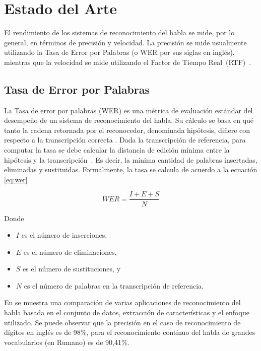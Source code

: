 \section{Estado del Arte}
\label{sec:estado}

El rendimiento de los sistemas de reconocimiento del habla se mide, por lo general, en t\'erminos
de precisi\'on y velocidad. La precisi\'on se mide usualmente utilizando la Tasa de Error por Palabras
(o WER por sus siglas en ingl\'es), mientras que la velocidad se mide utilizando el Factor de 
Tiempo \mbox{Real (RTF) \cite{GaikwadAReview2010}}.

\subsection{Tasa de Error por Palabras}
\label{sec:wer}

La Tasa de error por palabras (WER) es una m\'etrica de evaluaci\'on est\'andar del desempe\~no de un sistema de
reconocimiento del habla. Su c\'alculo se basa en qu\'e tanto la cadena retornada por el reconocedor,
denominada hip\'otesis, difiere con respecto a la transcripci\'on correcta \cite{Jurafsky}. 
Dada la transcripci\'on de referencia, para computar la tasa se debe calcular la distancia de edici\'on m\'inima
entre la hip\'otesis y la \mbox{transcripci\'on \cite{GaikwadAReview2010}}. Es decir, la m\'inima cantidad de palabras insertadas, eliminadas y
sustituidas. Formalmente, la tasa se calcula de acuerdo a la ecuaci\'on \eqref{eq:wer}

\begin{equation}
\label{eq:wer}
    WER = \frac{I + E + S}{N} 
\end{equation}

Donde

\begin{itemize}
    \item $I$ es el n\'umero de inserciones,
    \item $E$ es el n\'umero de eliminaciones,
    \item $S$ es el n\'umero de sustituciones, y
    \item $N$ es el n\'umero de palabras en la transcripci\'on de referencia.
\end{itemize}

En \cite{VimalaReview2012} se muestra una comparaci\'on de varias aplicaciones de reconocimiento del habla basada
en el conjunto de datos, extracci\'on de caracter\'isticas y el enfoque utilizado. Se puede observar que la precisi\'on
en el caso de reconocimiento de d\'igitos en ingl\'es es de 98\%, para el reconocimiento cont\'inuo del habla
de grandes vocabularios (en Rumano) es de 90,41\%.

